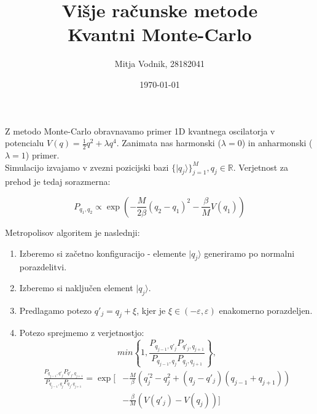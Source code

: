 \documentclass[a4paper]{article}
\newcommand{\half}{\frac{1}{2}}
\newcommand{\ket}[1]{|#1\rangle}
\begin{document}
    \title{\sc\large Višje računske metode\\
		\bigskip
		\bf\Large Kvantni Monte-Carlo}
	\author{Mitja Vodnik, 28182041}
	\date{\today}
	\maketitle

    Z metodo Monte-Carlo obravnavamo primer 1D kvantnega oscilatorja v potencialu $V(q) = \half q^2 + \lambda q^4$.
    Zanimata nas harmonski ($\lambda = 0$) in anharmonski ($\lambda = 1$) primer. \\

    Simulacijo izvajamo v zvezni pozicijski bazi $\{ \ket{q_j} \}_{j=1}^M, q_j \in \mathbb{R}$.
    Verjetnost za prehod je tedaj sorazmerna:

    \begin{equation}\label{eq1}
        P_{q_1, q_2} \propto \exp \left( -\frac{M}{2\beta}(q_2 - q_1)^2 - \frac{\beta}{M}V(q_1) \right)
    \end{equation}

    Metropolisov algoritem je naslednji:

    \begin{enumerate}
        \item Izberemo si začetno konfiguracijo - elemente $\ket{q_j}$ generiramo po normalni porazdelitvi.
        \item Izberemo si naključen element $\ket{q_j}$.
        \item Predlagamo potezo $q'_j = q_j + \xi$, kjer je $\xi \in (-\varepsilon, \varepsilon)$ enakomerno porazdeljen.
        \item Potezo sprejmemo z verjetnostjo:
        \begin{equation}\label{eq2}
            min \left\{ 1, \frac{P_{q_{j-1}, q'_j} P_{q'_j, q_{j+1}}}{P_{q_{j-1}, q_j} P_{q_j, q_{j+1}}} \right\},
        \end{equation}
        \begin{equation}\label{eq3}
            \begin{split}
                \frac{P_{q_{j-1}, q'_j} P_{q'_j, q_{j+1}}}{P_{q_{j-1}, q_j} P_{q_j, q_{j+1}}} =
                \exp \biggl[ &-\frac{M}{\beta}\left(q_j^{\prime 2} - q_j^2 + (q_j - q'_j)(q_{j-1} + q_{j+1})\right) \\
                            &- \frac{\beta}{M}\left(V(q'_j) - V(q_j)\right) \biggr]
            \end{split}
        \end{equation}
    \end{enumerate}
\end{document}
